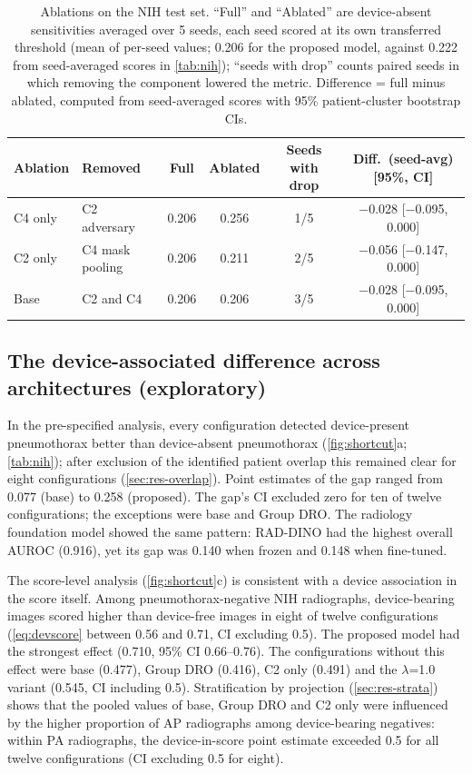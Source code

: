 \documentclass{ieeeaccess}
\newcommand{\ci}[2]{\scriptsize[#1, #2]}
\begin{document}
\begin{table}[!t]
\centering\small
\caption{Ablations on the NIH test set. ``Full'' and ``Ablated'' are device-absent sensitivities averaged over 5 seeds, each seed scored at its own transferred threshold (mean of per-seed values; 0.206 for the proposed model, against 0.222 from seed-averaged scores in \cref{tab:nih}); ``seeds with drop'' counts paired seeds in which removing the component lowered the metric. Difference = full minus ablated, computed from seed-averaged scores with 95\% patient-cluster bootstrap CIs.}
\label{tab:ablation}
\begin{tabular}{@{}l l c c c c@{}}
\toprule
Ablation & Removed & Full & Ablated & Seeds with drop & Diff.\ (seed-avg) \ci{95\%}{CI} \\
\midrule
C4 only & C2 adversary & 0.206 & 0.256 & 1/5 & $-$0.028 \ci{$-$0.095}{0.000} \\
C2 only & C4 mask pooling & 0.206 & 0.211 & 2/5 & $-$0.056 \ci{$-$0.147}{0.000} \\
Base & C2 and C4 & 0.206 & 0.206 & 3/5 & $-$0.028 \ci{$-$0.095}{0.000} \\
\bottomrule
\end{tabular}
\end{table}

\subsection{The device-associated difference across architectures (exploratory)}
\label{sec:res-shortcut}
In the pre-specified analysis, every configuration detected device-present pneumothorax better than device-absent pneumothorax (\cref{fig:shortcut}a; \cref{tab:nih}); after exclusion of the identified patient overlap this remained clear for eight configurations (\cref{sec:res-overlap}). Point estimates of the gap ranged from 0.077 (base) to 0.258 (proposed). The gap's CI excluded zero for ten of twelve configurations; the exceptions were base and Group DRO. The radiology foundation model showed the same pattern: RAD-DINO had the highest overall AUROC (0.916), yet its gap was 0.140 when frozen and 0.148 when fine-tuned.

The score-level analysis (\cref{fig:shortcut}c) is consistent with a device association in the score itself. Among pneumothorax-negative NIH radiographs, device-bearing images scored higher than device-free images in eight of twelve configurations (\cref{eq:devscore} between 0.56 and 0.71, CI excluding 0.5). The proposed model had the strongest effect (0.710, 95\% CI 0.66--0.76). The configurations without this effect were base (0.477), Group DRO (0.416), C2 only (0.491) and the $\lambda$=1.0 variant (0.545, CI including 0.5). Stratification by projection (\cref{sec:res-strata}) shows that the pooled values of base, Group DRO and C2 only were influenced by the higher proportion of AP radiographs among device-bearing negatives: within PA radiographs, the device-in-score point estimate exceeded 0.5 for all twelve configurations (CI excluding 0.5 for eight).
\end{document}
